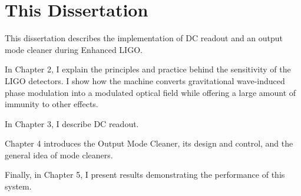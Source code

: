 \section{This Dissertation}


This dissertation describes the implementation of DC readout and an
output mode cleaner during Enhanced LIGO.

In Chapter 2, I explain the principles and practice behind the
sensitivity of the LIGO detectors.  I show how the machine converts
gravitational wave-induced phase modulation into a modulated optical
field while offering a large amount of immunity to other effects.

In Chapter 3, I describe DC readout.

Chapter 4 introduces the Output Mode Cleaner, its design and control,
and the general idea of mode cleaners.

Finally, in Chapter 5, I present results demonstrating the performance
of this system.


